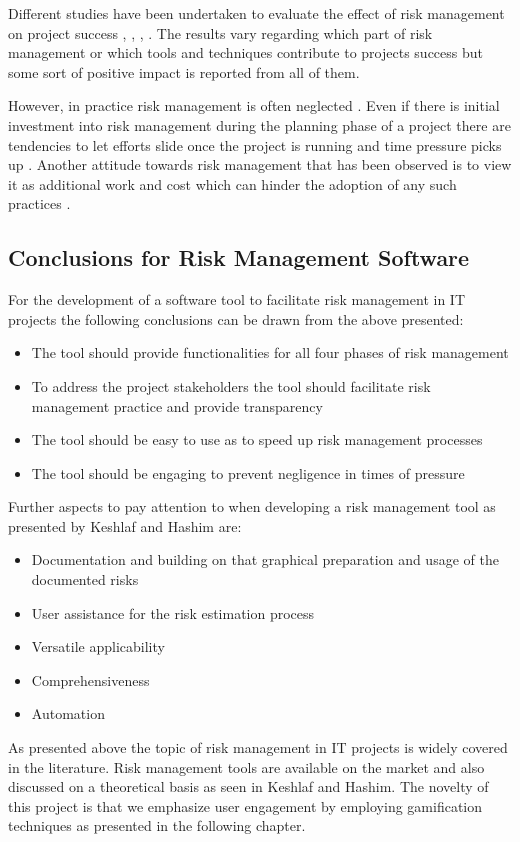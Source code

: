Different studies have been undertaken to evaluate the effect of risk management on project success \cite{debakkerDoesRiskManagement2010}, \cite{didragaRoleEffectsRisk2013}, \cite{kwakProjectRiskManagement2004}, \cite{juniorUnderstandingImpactProject2013}. The results vary regarding which part of risk management or which tools and techniques contribute to projects success but some sort of positive impact is reported from all of them.

However, in practice risk management is often neglected \cite{kwakProjectRiskManagement2004}. Even if there is initial investment into risk management during the planning phase of a project there are tendencies to let efforts slide once the project is running and time pressure picks up \cite{peixotoProjectRiskManagement2014}. Another attitude towards risk management that has been observed is to view it as additional work and cost which can hinder the adoption of any such practices \cite{teschITProjectRisk2007}.

\subsection{Conclusions for Risk Management Software}
\label{sec:theoryAd}
For the development of a software tool to facilitate risk management in IT projects the following conclusions can be drawn from the above presented:
\begin{itemize}
	\item The tool should provide functionalities for all four phases of risk management
	\item To address the project stakeholders the tool should facilitate risk management practice and provide transparency
	\item The tool should be easy to use as to speed up risk management processes
	\item The tool should be engaging to prevent negligence in times of pressure	
\end{itemize}
Further aspects to pay attention to when developing a risk management tool as presented by Keshlaf and Hashim \cite{keshlafModelPrototypeTool2000} are:
\begin{itemize}
	\item	Documentation and building on that graphical preparation and usage of the documented risks
	\item	User assistance for the risk estimation process
	\item	Versatile applicability
	\item	Comprehensiveness
	\item	Automation	
\end{itemize}

As presented above the topic of risk management in IT projects is widely covered in the literature. Risk management tools are available on the market and also discussed on a theoretical basis as seen in Keshlaf and Hashim. The novelty of this project is that we emphasize user engagement by employing gamification techniques as presented in the following chapter.